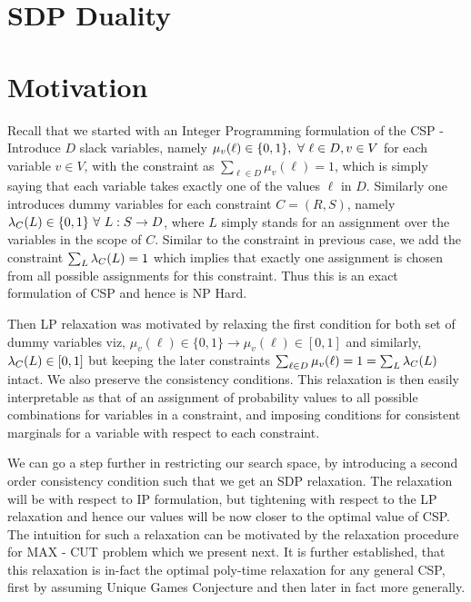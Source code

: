 %
%
%
%

\section{SDP Duality}

%
%

\section{Motivation}

Recall that we started with an Integer Programming formulation of the CSP - Introduce $D$ slack variables, namely $\mu_v(\ell) \in \{ 0, 1 \}, \ \forall \  \ell \in D, v \in V $ for each variable $v \in V$, with the constraint as $\sum_{\ell  \in D} \mu_v(\ell) = 1$, which is simply saying that each variable takes exactly one of the values $\ell$ in $D$. 
Similarly one introduces dummy variables for each constraint $C=(R,S)$, namely $\lambda_C(L) \in \{ 0, 1\} \ \forall \  L : S \rightarrow D$, where $L$ simply stands for an assignment over the variables in the scope of $C$. 
Similar to the constraint in previous case, we add the constraint $\sum_L \lambda_C(L) = 1$ which implies that exactly one assignment is chosen from all possible assignments for this constraint.  
Thus this is an exact formulation of CSP and hence is NP Hard. 

Then LP relaxation was motivated by relaxing the first condition for both set of dummy variables viz, $\mu_v(\ell) \in \{ 0, 1\} \rightarrow \mu_v(\ell) \in [0, 1]$ and similarly, $\lambda_C(L) \in [0, 1]$ but keeping the later constraints $\sum_{\ell  \in D} \mu_v(\ell) = 1 = \sum_L \lambda_C(L)$ intact. 
We also preserve the consistency conditions. 
This relaxation is then easily interpretable as that of an assignment of probability values to all possible combinations for variables in a constraint, and imposing conditions for consistent marginals for a variable with respect to each constraint. 

We can go a step further in restricting our search space, by introducing a second order consistency condition such that we get an SDP relaxation. 
The relaxation will be with respect to IP formulation, but tightening with respect to the LP relaxation and hence our values will be now closer to the optimal value of CSP. 
The intuition for such a relaxation can be motivated by the relaxation procedure for MAX - CUT problem which we present next. 
It is further established, that this relaxation is in-fact the optimal poly-time relaxation for any general CSP, first by assuming Unique Games Conjecture and then later in fact more generally. 

